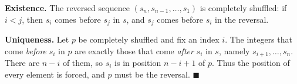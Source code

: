 \textbf{Existence.} The reversed sequence $(s_n,s_{n-1},\ldots,s_1)$ is completely shuffled: if $i<j$, then $s_i$ comes before $s_j$ in $s$, and $s_j$ comes before $s_i$ in the reversal.

\textbf{Uniqueness.} Let $p$ be completely shuffled and fix an index $i$. The integers that come \emph{before} $s_i$ in $p$ are exactly those that come \emph{after} $s_i$ in $s$, namely $s_{i+1},\ldots,s_n$. There are $n-i$ of them, so $s_i$ is in position $n-i+1$ of $p$. Thus the position of every element is forced, and $p$ must be the reversal. $\blacksquare$
